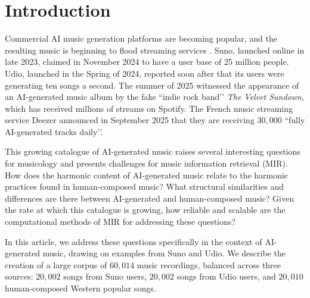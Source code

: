 \documentclass{article}
\begin{document}
\section{Introduction}
Commercial AI music generation platforms are becoming popular, and the resulting music is beginning to flood streaming services \citep{Sturm2024a}. Suno, launched online in late 2023, claimed in November 2024 to have a user base of 25 million people. Udio,
launched in the Spring of 2024, reported soon after that its users were generating ten songs a second.
The summer of 2025 witnessed the appearance of an AI-generated music album by the fake ``indie rock band’' {\em The Velvet Sundown}, which has received millions of streams on Spotify.
The French music streaming service Deezer announced in September 2025 that they are receiving $30,000$ ``fully AI-generated tracks daily’’.

This growing catalogue of AI-generated music raises several interesting questions for musicology and presents challenges for music information retrieval (MIR). How does the harmonic content of AI-generated music relate to the harmonic practices found in human-composed music? What structural similarities and differences are there between AI-generated and human-composed music? Given the rate at which this catalogue is growing, how reliable and scalable are the computational methods of MIR for addressing these questions?

In this article, we address these questions specifically in the context of AI-generated music, drawing on examples from Suno and Udio. We describe the creation of a large corpus of $60,014$ music recordings, balanced across three sources: $20,002$ songs from Suno users, $20,002$ songs from Udio users, and $20,010$ human-composed Western popular songs. 
\end{document}
